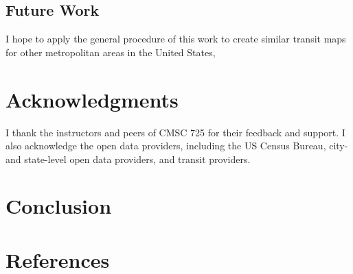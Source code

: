 \documentclass[manuscript]{acmart}
\begin{document}
\subsection{Future Work}

I hope to apply the general procedure of this work to create similar transit maps for other metropolitan areas in the United States, 


\section{Acknowledgments}

I thank the instructors and peers of CMSC 725 for their feedback and support. I also acknowledge the open data providers, including the US Census Bureau, city- and state-level open data providers, and transit providers.

\section{Conclusion}

\section{References}



\end{document}
